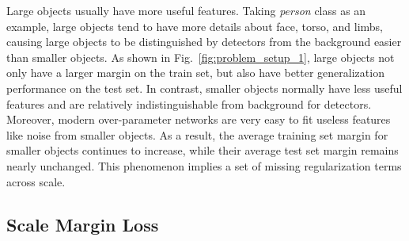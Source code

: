 \documentclass{article}
\begin{document}

Large objects usually have more useful features. Taking \textit{ person} class as an example, large objects tend to have more details about face, torso, and limbs, causing large objects to be distinguished by detectors from the background  easier than smaller objects. As shown in Fig.~\ref{fig:problem_setup_1}, large objects not only have a larger margin on the train set, but also have better generalization performance on the test set.
%
%
In contrast, smaller objects normally have less useful features and are relatively indistinguishable from background for detectors. Moreover, modern over-parameter networks are very easy to fit useless features like noise from smaller objects. 
As a result, the average training set margin for smaller objects continues to increase, while their average test set margin remains nearly unchanged. 
This phenomenon implies a set of missing regularization terms across scale.

\subsection{Scale Margin Loss}
\label{section_3_2}


\end{document}
